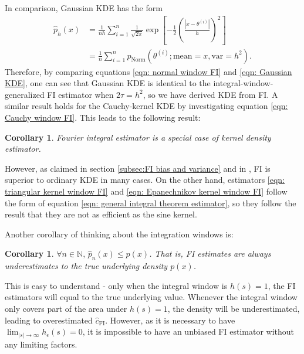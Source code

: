 \documentclass[%
 reprint,
 amsmath,amssymb,
 aps,
]{revtex4-2}
\newtheorem{corollary}[theorem]{Corollary}
\def\N{\mathbb{N}}
\begin{document}
In comparison, Gaussian KDE has the form
\begin{align} \label{eqn: Gaussian KDE}
    \hat{p}_h(x) & = \frac{1}{nh}\sum_{i = 1}^n \frac{1}{\sqrt{2\pi}}\exp\left[-\frac{1}{2}\left(\frac{|x - \theta^{(i)}|}{h} \right)^2 \right] \\
    & = \frac{1}{n}\sum_{i = 1}^n p_\text{Norm}(\theta^{(i)}; \text{mean} = x, \text{var} = h^2).
\end{align}
Therefore, by comparing equations \eqref{eqn: normal window FI} and \eqref{eqn: Gaussian KDE}, one can see that Gaussian KDE is identical to the integral-window-generalized FI estimator when $2\tau = h^2$, so we have derived KDE from FI. A similar result holds for the Cauchy-kernel KDE by investigating equation \eqref{eqn: Cauchy window FI}. This leads to the following result:

\begin{corollary}
Fourier integral estimator is a special case of kernel density estimator.    
\end{corollary}

However, as claimed in section \ref{subsec:FI bias and variance} and in \cite{rotiroti2022computing}, FI is superior to ordinary KDE in many cases. On the other hand, estimators \eqref{eqn: triangular kernel window FI} and \eqref{eqn: Epanechnikov kernel window FI} follow the form of equation \eqref{eqn: general integral theorem estimator}, so they follow the result \cite{ho2021integral} that they are not as efficient as the sine kernel.

Another corollary of thinking about the integration windows is:
\begin{corollary} \label{corollary: FI estimators underestimate densities}
    $\forall n \in \N, \, \hat{p}_n(x) \le p(x)$. That is, FI estimates are always underestimates to the true underlying density $p(x)$.
\end{corollary}

This is easy to understand - only when the integral window is $h(s) = 1$, the FI estimators will equal to the true underlying value. Whenever the integral window only covers part of the area under $h(s) = 1$, the density will be underestimated, leading to overestimated $\hat{c}_\text{FI}$. However, as it is necessary to have $\displaystyle\lim_{|s| \to \infty} h_\epsilon(s) = 0$, it is impossible to have an unbiased FI estimator without any limiting factors.
\end{document}
